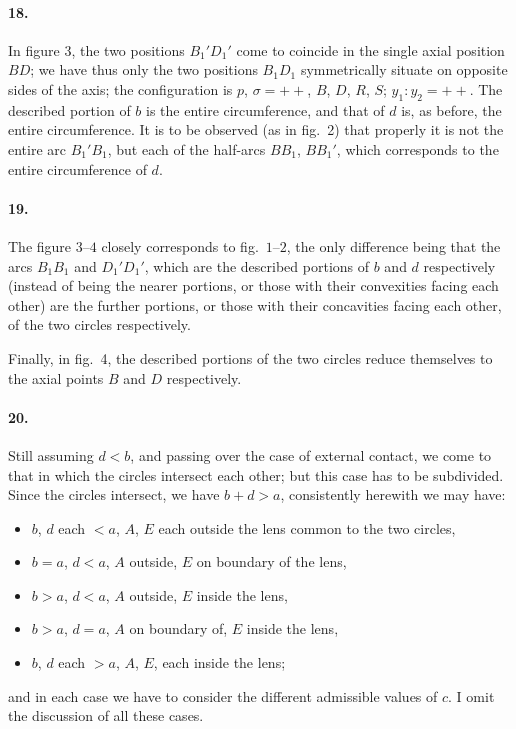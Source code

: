 \documentclass[11pt,a4paper]{article}
\theoremstyle{plain}
\begin{document}
\paragraph{18.} In figure 3, the two positions $B_1'D_1'$ come to coincide in the single axial position $BD$; we have thus only the two positions $B_1D_1$ symmetrically situate on opposite sides of the axis; the configuration is $p$, $\sigma = ++$, $B$, $D$, $R$, $S$; $y_1 : y_2 = ++$. The described portion of $b$ is the entire circumference, and that of $d$ is, as before, the entire circumference. It is to be observed (as in fig.~2) that properly it is not the entire arc $B_1'B_1$, but each of the half-arcs $BB_1$, $BB_1'$, which corresponds to the entire circumference of $d$.

\paragraph{19.} The figure $3\text{--}4$ closely corresponds to fig.~$1\text{--}2$, the only difference being that the arcs $B_1B_1$ and $D_1'D_1'$, which are the described portions of $b$ and $d$ respectively (instead of being the nearer portions, or those with their convexities facing each other) are the further portions, or those with their concavities facing each other, of the two circles respectively.

Finally, in fig.~4, the described portions of the two circles reduce themselves to the axial points $B$ and $D$ respectively.

\paragraph{20.} Still assuming $d < b$, and passing over the case of external contact, we come to that in which the circles intersect each other; but this case has to be subdivided. Since the circles intersect, we have $b + d > a$, consistently herewith we may have:
\begin{itemize}
\item $b$, $d$ each $< a$, $A$, $E$ each outside the lens common to the two circles,
\item $b = a$, $d < a$, $A$ outside, $E$ on boundary of the lens,
\item $b > a$, $d < a$, $A$ outside, $E$ inside the lens,
\item $b > a$, $d = a$, $A$ on boundary of, $E$ inside the lens,
\item $b$, $d$ each $> a$, $A$, $E$, each inside the lens;
\end{itemize}
and in each case we have to consider the different admissible values of $c$. I omit the discussion of all these cases.
\end{document}
